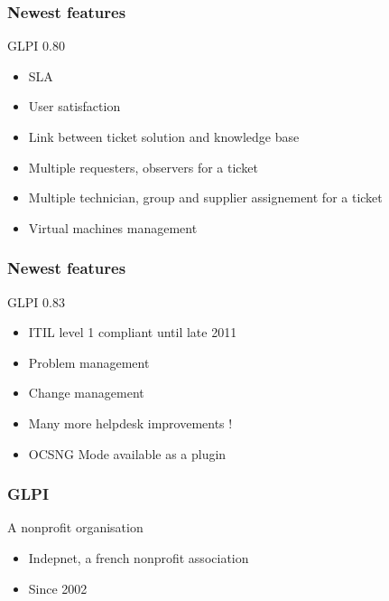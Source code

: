 \documentclass{beamer}
\begin{document}
\begin{frame}

    \frametitle{Newest features}

    \begin{block}{GLPI 0.80}
        \begin{itemize}
            \item SLA
            \item User satisfaction 
            \item Link between ticket solution and knowledge base 
            \item Multiple requesters, observers for a ticket
            \item Multiple technician, group and supplier assignement for a ticket
            \item Virtual machines management 
        \end{itemize}
    \end{block}

\end{frame}

\begin{frame}

    \frametitle{Newest features}

    \begin{block}{GLPI 0.83}
        \begin{itemize}
            \item ITIL level 1 compliant until late 2011
            \item Problem management
            \item Change management
            \item Many more helpdesk improvements !
            \item OCSNG Mode available as a plugin
        \end{itemize}
    \end{block}

\end{frame}

\begin{frame}

    \frametitle{GLPI}

    \begin{block}{A nonprofit organisation}
        \begin{itemize}
            \item Indepnet, a french nonprofit association
            \item Since 2002
        \end{itemize}
    \end{block}

\end{frame}
\end{document}
